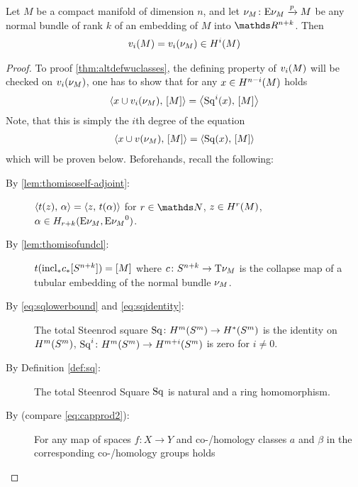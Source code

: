 \begin{Thm}\label{thm:altdefwuclasses}
  Let $M$ be a compact manifold of dimension $n$, and let
  $\nu_{M}\colon \mathrm{E}\nu_{M} \xrightarrow{p} M$ be
  any normal bundle of rank $k$ of an embedding of $M$ into
  $\R^{n+k}$. Then
  \begin{gather*}
    {v_{i}}(M) = {v_{i}}(\nu_{M})\in H^i(M)
  \end{gather*}
  \begin{proof}
    To proof \autoref{thm:altdefwuclasses}, the defining property of
    ${v_{i}}(M)$ will be checked on ${v_{i}}(\nu_{M})$, \idest one has to show
    that for any $x\in H^{n-i}(M)$ holds
    \begin{gather*}
      \left\langle x\cup {v_{i}}(\nu_{M}),\, [M] \right\rangle
      = \left\langle \mathrm{Sq}^{i}(x),\, [M] \right\rangle
    \end{gather*}
    Note, that this is simply the $i$th degree of the equation
    \begin{gather}\label{eq:proofaltdefwuclasses:claim}
      \left\langle x\cup {v_{}}(\nu_{M}),\, [M] \right\rangle
      = \left\langle \mathrm{Sq}(x),\, [M] \right\rangle
    \end{gather}
    which will be proven below.
    Beforehands, recall the following:
    \begin{description}
    \item[By \autoref{lem:thomisoself-adjoint}:]
      $\left\langle t(z),\, \alpha \right\rangle = \left\langle z,\, t(\alpha) \right\rangle$
      for $r\in\Nat$, $z\in H^r(M)$,
      $\alpha\in H_{r+k}(\mathrm{E}\nu_{M}, {\mathrm{E}\nu_{M}}^0)$.
    \item[By \autoref{lem:thomisofundcl}:]
      $t({\mathrm{incl}}_*{c}_*[S^{n+k}]) = [M]$
      where $c\colon S^{n+k}\to \mathrm{T}{\nu_{M}}$ is
      the collapse map of a tubular embedding of the normal bundle $\nu_{M}$.
    \item[By \eqref{eq:sqlowerbound} and \eqref{eq:sqidentity}:]
      The total Steenrod square
      $\mathrm{Sq}\colon H^m(S^{m})
      \to H^*(S^{m})$
      is the identity on $H^m(S^{m})$, \idest
      $\mathrm{Sq}^{i}\colon H^m(S^{m})\to H^{m+i}(S^{m})$ is zero for
      $i\neq0$.
    \item[By Definition \autoref{def:sq}:] The total Steenrod Square
      $\mathrm{Sq}$ is natural and a ring homomorphism.
    \item[By {\cite[Chap.~3.3.2, p.~241]{hatcher}}
      (compare \eqref{eq:capprod2}):] %
      For any map of spaces $f\colon X\to Y$ and co-/homology classes
      $a$ and $\beta$ in the corresponding co-/homology groups holds

\end{description}
\end{proof}
\end{Thm}

